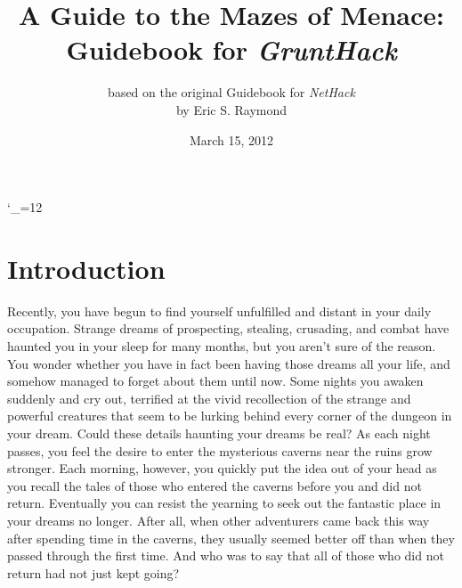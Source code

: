 
\textheight 220mm
\textwidth 160mm
\oddsidemargin 0mm
\evensidemargin 0mm
\topmargin 0mm

\newcommand{\nd}{\noindent}

\newcommand{\tb}[1]{\tt #1 \hfill}
\newcommand{\bb}[1]{\bf #1 \hfill}
\newcommand{\ib}[1]{\it #1 \hfill}

\newcommand{\blist}[1]
{\begin{list}{$\bullet$}
    {\leftmargin 30mm \topsep 2mm \partopsep 0mm \parsep 0mm \itemsep 1mm
         \labelwidth 28mm \labelsep 2mm
	      #1}}
	      
\newcommand{\elist}{\end{list}}
	      
\catcode`\_=12

%
%
\title{\LARGE A Guide to the Mazes of Menace:\\
\Large Guidebook for {\it GruntHack\/}}

\author{based on the original Guidebook for {\it NetHack\/}\\
by Eric S. Raymond }
\date{March 15, 2012}

\maketitle
\section{Introduction}

Recently, you have begun to find yourself unfulfilled and distant 
in your daily occupation.  Strange dreams of prospecting, stealing, 
crusading, and combat have haunted you in your sleep for many months, 
but you aren't sure of the reason.  You wonder whether you have in 
fact been having those dreams all your life, and somehow managed to 
forget about them until now.  Some nights you awaken suddenly
and cry out, terrified at the vivid recollection of the strange and 
powerful creatures that seem to be lurking behind every corner of the 
dungeon in your dream.  Could these details haunting your dreams be real?  
As each night passes, you feel the desire to enter the mysterious caverns 
near the ruins grow stronger.  Each morning, however, you quickly put 
the idea out of your head as you recall the tales of those who entered 
the caverns before you and did not return.  Eventually you can resist 
the yearning to seek out the fantastic place in your dreams no longer.  
After all, when other adventurers came back this way after spending time 
in the caverns, they usually seemed better off than when they passed 
through the first time.  And who was to say that all of those who did 
not return had not just kept going?



